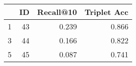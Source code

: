 \begin{tabular}{lrrr}
\toprule
{} &  ID &  Recall@10 &  Triplet Acc \\
\midrule
1 &  43 &      0.239 &        0.866 \\
3 &  44 &      0.166 &        0.822 \\
5 &  45 &      0.087 &        0.741 \\
\bottomrule
\end{tabular}
